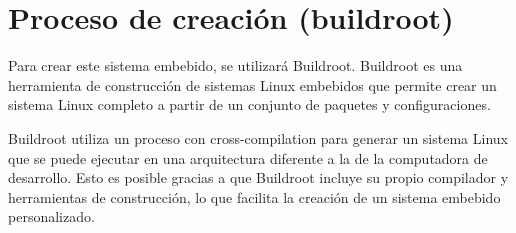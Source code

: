 \documentclass[12pt, letterpaper]{article}
\begin{document}



	\section{Proceso de creación (buildroot)}

	Para crear este sistema embebido, se utilizará Buildroot. Buildroot es una herramienta de construcción de sistemas Linux embebidos que permite crear un sistema Linux completo a partir de un conjunto de paquetes y configuraciones.

	Buildroot utiliza un proceso con cross-compilation para generar un sistema Linux que se puede ejecutar en una arquitectura diferente a la de la computadora de desarrollo. Esto es posible gracias a que Buildroot incluye su propio compilador y herramientas de construcción, lo que facilita la creación de un sistema embebido personalizado.
\end{document}
